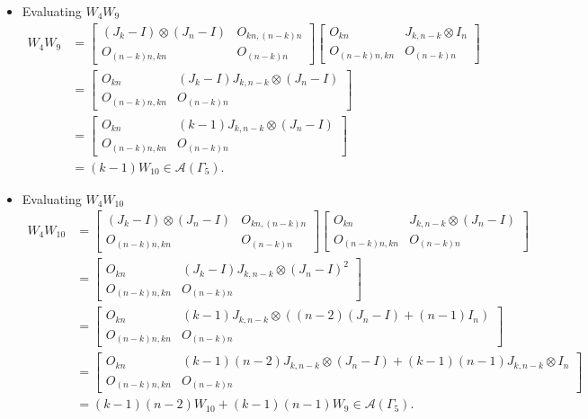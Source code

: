 \begin{itemize}
\item Evaluating $W_{4}W_{9}$
\begin{align*}
    W_4W_9 &=
    \begin{bmatrix}
        (J_k - I) \otimes (J_n - I) & O_{kn, (n-k)n} \\
        O_{(n-k)n,kn} & O_{(n-k)n}
    \end{bmatrix}
    \begin{bmatrix}
        O_{kn} & J_{k,n-k} \otimes I_n \\
        O_{(n-k)n,kn} & O_{(n-k)n}
    \end{bmatrix}\\
    &= \begin{bmatrix}
    O_{kn} & (J_k-I)J_{k,n-k} \otimes (J_n-I) \\
    O_{(n-k)n,kn} & O_{(n-k)n}
    \end{bmatrix}\\
    &= \begin{bmatrix}
    O_{kn} & (k-1)J_{k,n-k} \otimes (J_n-I) \\
    O_{(n-k)n,kn} & O_{(n-k)n}
    \end{bmatrix}\\
    &= (k-1)W_{10} \in\mathcal{A}(\Gamma_5).
\end{align*}

\item Evaluating $W_{4}W_{10}$
\begin{align*}
    W_4W_{10} &=
    \begin{bmatrix}
        (J_k - I) \otimes (J_n - I) & O_{kn, (n-k)n} \\
        O_{(n-k)n,kn} & O_{(n-k)n}
    \end{bmatrix}
    \begin{bmatrix}
        O_{kn} & J_{k,n-k} \otimes (J_n-I) \\
        O_{(n-k)n,kn} & O_{(n-k)n}
    \end{bmatrix}\\
    &= \begin{bmatrix}
    O_{kn} & (J_k-I)J_{k,n-k} \otimes (J_n-I)^2 \\
    O_{(n-k)n,kn} & O_{(n-k)n}
    \end{bmatrix}\\
    &= \begin{bmatrix}
    O_{kn} & (k-1)J_{k,n-k} \otimes ((n-2)(J_n-I) + (n-1)I_n) \\
    O_{(n-k)n,kn} & O_{(n-k)n}
    \end{bmatrix}\\
    &= \begin{bmatrix}
    O_{kn} & (k-1)(n-2)J_{k,n-k} \otimes (J_n-I) + (k-1)(n-1)J_{k,n-k}\otimes I_n \\
    O_{(n-k)n,kn} & O_{(n-k)n}
    \end{bmatrix}\\
    &= (k-1)(n-2)W_{10} + (k-1)(n-1)W_9 \in\mathcal{A}(\Gamma_5).
\end{align*}


\end{itemize}

